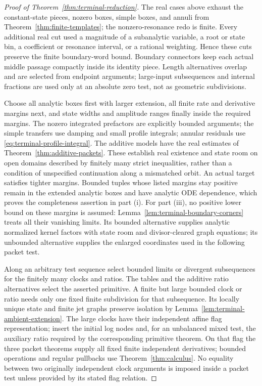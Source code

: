 \begin{proof}[Proof of Theorem~\ref{thm:terminal-reduction}]
The real cases above exhaust the constant-state pieces, nozero boxes,
simple boxes, and annuli
from Theorem~\ref{thm:finite-templates}; the nonzero-resonance redo is
finite.  Every additional real cut used a magnitude of a subanalytic
variable, a root or state bin, a coefficient or resonance interval, or a
rational weighting.  Hence these cuts preserve the finite boundary-word
bound.  Boundary connectors keep each actual middle passage compactly
inside its identity piece.  Length alternatives overlap and are selected
from endpoint arguments; large-input subsequences and internal fractions
are used only at an absolute zero test, not as geometric subdivisions.

Choose all analytic boxes first with larger extension, all finite rate
and derivative margins next, and state widths and amplitude ranges finally
inside the required margins.  The nozero integrated prefactors are
explicitly bounded arguments; the simple transfers use damping and small
profile integrals; annular residuals use
\eqref{eq:terminal-profile-integral}.  The additive models have the real
estimates of Theorem~\ref{thm:additive-packets}.  These establish real
existence and state room on open domains described by finitely many strict
inequalities, rather than a condition of unspecified continuation along a
mismatched orbit.  An actual target satisfies tighter margins.  Bounded
tuples whose listed margins stay positive remain in the extended analytic
boxes and have analytic ODE dependence, which proves the completeness
assertion in part (i).  For part (iii), no positive lower bound on these
margins is assumed: Lemma~\ref{lem:terminal-boundary-corners} treats all
their vanishing limits.  Its bounded alternative supplies analytic
normalized kernel factors with state room and divisor-cleared graph
equations; its unbounded alternative supplies the enlarged coordinates
used in the following packet test.

Along an arbitrary test sequence select bounded limits or divergent
subsequences for the finitely many clocks and ratios.  The tables and the
additive ratio alternatives select the asserted primitive.  A finite but
large bounded clock or ratio needs only one fixed finite subdivision for
that subsequence.  Its locally unique state and finite jet graphs preserve
isolation by Lemma~\ref{lem:terminal-ambient-extension}.  The large clocks
have their independent affine flag representation; insert the initial
log nodes and, for an unbalanced mixed test, the auxiliary ratio required
by the corresponding primitive theorem.  On that flag the three packet
theorems supply all fixed finite independent derivatives; bounded
operations and regular pullbacks use Theorem~\ref{thm:calculus}.
No equality between two originally independent clock arguments is imposed
inside a packet test unless provided by its stated flag relation.


\end{proof}
